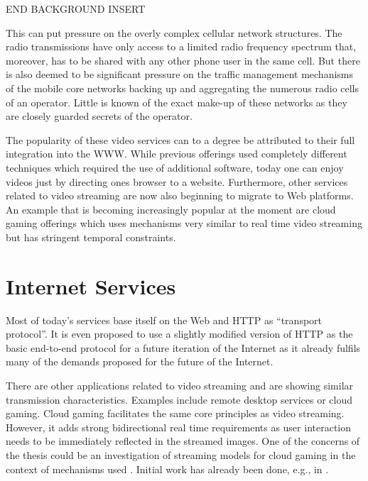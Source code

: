 END BACKGROUND INSERT


This can put pressure on the overly complex cellular network structures. The radio transmissions have only access to a limited radio frequency spectrum that, moreover, has to be shared with any other phone user in the same cell. But there is also deemed to be significant pressure on the traffic management mechanisms of the mobile core networks backing up and aggregating the numerous radio cells of an operator. Little is known of the exact make-up of these networks as they are closely guarded secrets of the operator.

The popularity of these video services can to a degree be attributed to their full integration into the WWW. While previous offerings used completely different techniques which required the use of additional software, today one can enjoy videos just by directing ones browser to a website. Furthermore, other services related to video streaming are now also beginning to migrate to Web platforms. An example that is becoming increasingly popular at the moment are cloud gaming offerings which uses mechanisms very similar to real time video streaming but has stringent temporal constraints.







\section{Internet Services}


Most of today's services base itself on the Web and HTTP as ``transport protocol''. It is even proposed to use
a slightly modified version of HTTP as the basic end-to-end protocol for a future iteration of the Internet\cite{Popa:2010:HNW:1868447.1868453} as it already fulfils many of the demands proposed for the future of the Internet.


There are other applications related to video streaming and are showing similar transmission characteristics. Examples include remote desktop services or cloud gaming. Cloud gaming facilitates the same core principles as video streaming. However, it adds strong bidirectional real time requirements as user interaction needs to be immediately reflected in the streamed images. One of the concerns of the thesis could be an investigation of streaming models for cloud gaming in the context of mechanisms used . Initial work has already been done, e.g., in \cite{4795441,wang2009modeling,jarschel2011cloudevaluation,ct2010wolken}.



